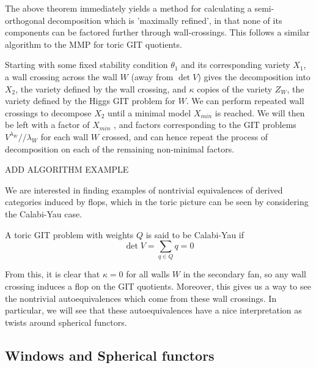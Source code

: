 The above theorem immediately yields a method for calculating a semi-orthogonal decomposition which is 'maximally refined', in that none of its components can be factored further through wall-crossings. This follows a similar algorithm to the MMP for toric GIT quotients. 

Starting with some fixed stability condition $\theta _1$ and its corresponding variety $X_1$, a wall crossing across the wall $W$ (away from $\det V$) gives the decomposition into $X_2$, the variety defined by the wall crossing, and $\kappa$ copies of the variety $Z_W$, the variety defined by the Higgs GIT problem for $W$. We can perform repeated wall crossings to decompose $X_2$ until a minimal model $X_{min}$ is reached. We will then be left with a factor of $X_{min}$ , and factors corresponding to the GIT problems $V^{\lambda_{W}} / / \lambda_{W}$ for each wall $W$ crossed, and can hence repeat the process of decomposition on each of the remaining non-minimal factors.

ADD ALGORITHM EXAMPLE

We are interested in finding examples of nontrivial equivalences of derived categories induced by flops, which in the toric picture can be seen by considering the Calabi-Yau case.

\begin{definition}{}{}
    A toric GIT problem with weights $Q$ is said to be Calabi-Yau if $$\det V = \sum_{q \in Q} q = 0$$
\end{definition}

From this, it is clear that $\kappa = 0$ for all walls $W$ in the secondary fan, so any wall crossing induces a flop on the GIT quotients. Moreover, this gives us a way to see the nontrivial autoequivalences which come from these wall crossings. In particular, we will see that these autoequivalences have a nice interpretation as twists around spherical functors. 

\subsection{Windows and Spherical functors}

